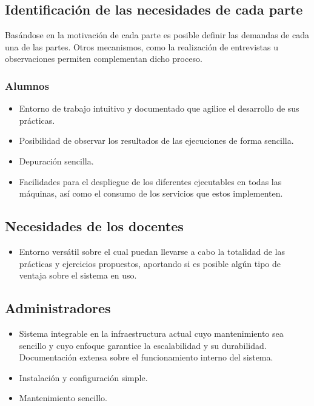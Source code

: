 \subsection{Identificación de las necesidades de cada parte}

Basándose en la motivación de cada parte es posible definir las demandas de cada una de las partes. Otros mecanismos, como la realización de entrevistas u observaciones permiten complementan dicho proceso.

\subsubsection{Alumnos}

\begin{itemize}
  \item Entorno de trabajo intuitivo y documentado que agilice el desarrollo de sus prácticas.
  \item Posibilidad de observar los resultados de las ejecuciones de forma sencilla.
  \item Depuración sencilla.
  \item Facilidades para el despliegue de los diferentes ejecutables en todas las máquinas, así como el consumo de los servicios que estos implementen.
\end{itemize}

\subsection{Necesidades de los docentes}

\begin{itemize}
  \item Entorno versátil sobre el cual puedan llevarse a cabo la totalidad de las prácticas y ejercicios propuestos, aportando si es posible algún tipo de ventaja sobre el sistema en uso.
\end{itemize}

\subsection{Administradores}

\begin{itemize}
  \item Sistema integrable en la infraestructura actual cuyo mantenimiento sea sencillo y cuyo enfoque garantice la escalabilidad y su durabilidad. Documentación extensa sobre el funcionamiento interno del sistema.
  \item Instalación y configuración simple.
  \item Mantenimiento sencillo.
\end{itemize}

